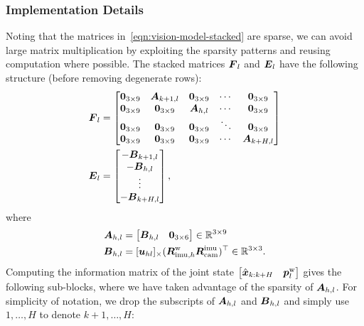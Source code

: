\subsubsection*{Implementation Details}
Noting that the matrices in~\eqref{eqn:vision-model-stacked} are sparse, we can avoid large matrix multiplication by exploiting the sparsity patterns and reusing computation where possible.
The stacked matrices $\boldsymbol F_l$ and $\boldsymbol E_l$ have the following structure (before removing degenerate rows):
\begin{align}
\boldsymbol F_l &=
\begin{bmatrix}
\boldsymbol 0_{3\times9} & \boldsymbol A_{k+1,l} & \boldsymbol 0_{3\times9} & \cdots & \boldsymbol 0_{3\times9} \\
\boldsymbol 0_{3\times9} & \boldsymbol 0_{3\times9} & \boldsymbol A_{h,l} & \cdots & \boldsymbol 0_{3\times9} \\
\boldsymbol 0_{3\times9} & \boldsymbol 0_{3\times9} & \boldsymbol 0_{3\times9} & \ddots & \boldsymbol 0_{3\times9} \\
\boldsymbol 0_{3\times9} & \boldsymbol 0_{3\times9} & \boldsymbol 0_{3\times9} & \cdots & \boldsymbol A_{k+H,l} \\
\end{bmatrix}\\
\boldsymbol E_l &=
\begin{bmatrix}
-\boldsymbol B_{k+1,l}\\
-\boldsymbol B_{h,l}\\
\vdots\\
-\boldsymbol B_{k+H,l}\\
\end{bmatrix},
\end{align}
where
\begin{align}
\boldsymbol A_{h,l} &= \begin{bmatrix}\boldsymbol B_{h,l} & \boldsymbol 0_{3\times 6}\end{bmatrix}\in\mathbb{R}^{3\times9}\\
\boldsymbol B_{h,l} &= [\boldsymbol u_{hl}]_\times(\boldsymbol R^\text{w}_{\text{imu},h}\boldsymbol R^\text{imu}_\text{cam})^\top\in\mathbb{R}^{3\times3}.
\end{align}
Computing the information matrix of the joint state $\begin{bmatrix}\hat{\boldsymbol x}_{k:k+H}&\boldsymbol p^\text{w}_l\end{bmatrix}$ gives the following sub-blocks, where we have taken advantage of the sparsity of $\boldsymbol A_{h,l}$.
For simplicity of notation, we drop the subscripts of $\boldsymbol A_{h,l}$ and $\boldsymbol B_{h,l}$ and simply use $1,\dots,H$ to denote $k+1,\dots,H$:
